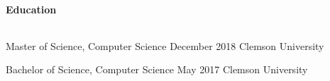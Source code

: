 \documentclass{article}
\begin{document}
  \paragraph{Education} $ $

  \hangindent=0.8in
  Master of Science, Computer Science \hfill December 2018 \newline
  Clemson University \newline

  \hangindent=0.8in
  Bachelor of Science, Computer Science \hfill May 2017 \newline
  Clemson University
  
\end{document}
